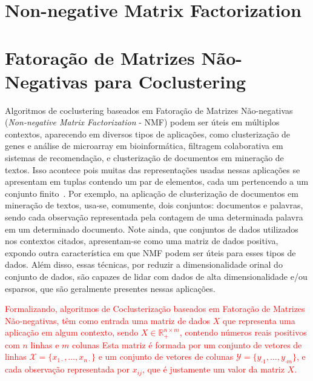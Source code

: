 \documentclass[
    12pt,                %
    oneside,            %
    a4paper,            %
    english,            %
    brazil                %
    ]{abntex2ppgsi}
\begin{document}

\section{Non-negative Matrix Factorization}


\section{Fatoração de Matrizes Não-Negativas para Coclustering}

Algoritmos de coclustering baseados em Fatoração de Matrizes Não-negativas (\textit{Non-negative Matrix Factorization} - NMF) podem ser úteis em múltiplos contextos, aparecendo em diversos tipos de aplicações, como clusterização de genes e análise de microarray em bioinformática, filtragem colaborativa em sistemas de recomendação, e clusterização de documentos em mineração de textos. %
Isso acontece pois muitas das representações usadas nessas aplicações se apresentam em tuplas contendo um par de elementos, cada um pertencendo a um conjunto finito~\cite{Long2005}.
Por exemplo, na aplicação de clusterização de documentos em mineração de textos, usa-se, comumente, dois conjuntos: documentos e palavras, sendo cada observação representada pela contagem de uma determinada palavra em um determinado documento.
Note ainda, que conjuntos de dados utilizados nos contextos citados, apresentam-se como uma matriz de dados positiva, expondo outra característica em que NMF podem ser úteis para esses tipos de dados.
Além disso, essas técnicas, por reduzir a dimensionalidade orinal do conjunto de dados, são capazes de lidar com dados de alta dimensionalidade e/ou esparsos, que são geralmente presentes nessas aplicações.

\textcolor{red}{Formalizando, algoritmos de Coclusterização baseados em Fatoração de Matrizes Não-negativas, têm como entrada uma matriz de dados $X$ que representa uma aplicação em algum contexto, sendo $X \in \mathbb{R}^{n \times m}_{+}$, contendo números reais positivos com $n$ linhas e $m$ colunas
Esta matriz é formada por um conjunto de vetores de linhas $\mathcal{X} = \{ x_{1 \cdot}, \dots, x_{n \cdot} \}$ e um conjunto de vetores de colunas ${\mathcal{Y}} = \{ y_{\cdot 1}, \dots, y_{\cdot m} \}$, e cada observação representada por $x_{ij}$, que é justamente um valor da matriz $X$.}
\end{document}
